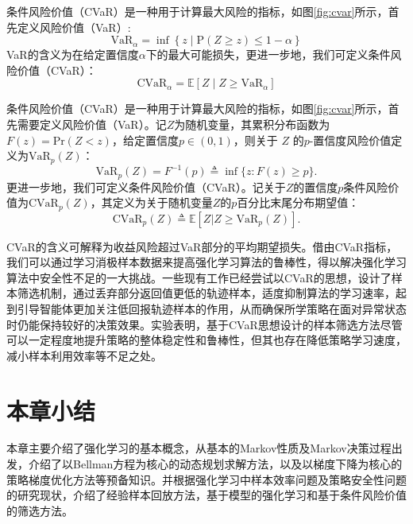 条件风险价值（CVaR）是一种用于计算最大风险的指标，如图\ref{fig:cvar}所示，首先定义风险价值（VaR）:
\begin{equation}
    \mathrm{VaR}_\alpha=\inf\left\{z\mid\mathrm{P}(Z\geq z)\leq 1-\alpha\right\}
\end{equation}
VaR的含义为在给定置信度$\alpha$下的最大可能损失，更进一步地，我们可定义条件风险价值（CVaR）：
\begin{equation}
    \mathrm{CVaR}_\alpha = \mathbb{E}\left[Z\mid Z\geq \mathrm{VaR}_\alpha\right]
\end{equation}

条件风险价值（CVaR）是一种用于计算最大风险的指标，如图\ref{fig:cvar}所示，首先需要定义风险价值（VaR）。记$Z$为随机变量，其累积分布函数为$F(z)=\mathrm{Pr}(Z<z)$，给定置信度$p \in (0,1)$，则关于 $Z$ 的$p$-置信度风险价值定义为$\mathrm{VaR}_p(Z)$：
\begin{equation}
    \mathrm{VaR}_p(Z)=F^{-1}(p)\triangleq \inf\{z:F(z)\geq p\}.
\end{equation}
更进一步地，我们可定义条件风险价值（CVaR）。记关于$Z$的置信度$p$条件风险价值为$\mathrm{CVaR}_p(Z)$，其定义为关于随机变量$Z$的$p$百分比末尾分布期望值：
\begin{equation}\label{eq:def-cvar}
    \mathrm{CVaR}_p(Z)\triangleq \mathbb{E}[Z|Z\geq \mathrm{VaR}_p(Z)].
\end{equation}

CVaR的含义可解释为收益风险超过VaR部分的平均期望损失。借由CVaR指标，我们可以通过学习消极样本数据来提高强化学习算法的鲁棒性，得以解决强化学习算法中安全性不足的一大挑战。一些现有工作已经尝试以CVaR的思想，设计了样本筛选机制\cite{rajeswaran2016epopt}，通过丢弃部分返回值更低的轨迹样本，适度抑制算法的学习速率，起到引导智能体更加关注低回报轨迹样本的作用，从而确保所学策略在面对异常状态时仍能保持较好的决策效果。实验表明，基于CVaR思想设计的样本筛选方法尽管可以一定程度地提升策略的整体稳定性和鲁棒性，但其也存在降低策略学习速度，减小样本利用效率等不足之处。

\section{本章小结}

本章主要介绍了强化学习的基本概念，从基本的Markov性质及Markov决策过程出发，介绍了以Bellman方程为核心的动态规划求解方法，以及以梯度下降为核心的策略梯度优化方法等预备知识。并根据强化学习中样本效率问题及策略安全性问题的研究现状，介绍了经验样本回放方法，基于模型的强化学习和基于条件风险价值的筛选方法。